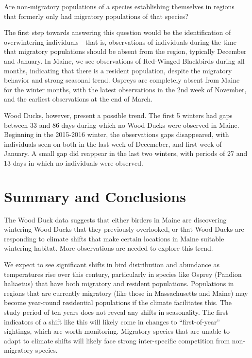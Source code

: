 \documentclass[
  12pt,
]{article}
\begin{document}
Are non-migratory populations of a species establishing themselves in
regions that formerly only had migratory populations of that species?

The first step towards answering this question would be the
identification of overwintering individuals - that is, observations of
individuals during the time that migratory populations should be absent
from the region, typically December and January. In Maine, we see
observations of Red-Winged Blackbirds during all months, indicating that
there is a resident population, despite the migratory behavior and
strong seasonal trend. Ospreys are completely absent from Maine for the
winter months, with the latest observations in the 2nd week of November,
and the earliest observations at the end of March.

Wood Ducks, however, present a possible trend. The first 5 winters had
gaps between 33 and 86 days during which no Wood Ducks were observed in
Maine. Beginning in the 2015-2016 winter, the observations gaps
disappeared, with individuals seen on both in the last week of
Decemeber, and first week of January. A small gap did reappear in the
last two winters, with periods of 27 and 13 days in which no individuals
were observed.

\newpage

\hypertarget{summary-and-conclusions}{%
\section{Summary and Conclusions}\label{summary-and-conclusions}}

The Wood Duck data suggests that either birders in Maine are discovering
wintering Wood Ducks that they previously overlooked, or that Wood Ducks
are responding to climate shifts that make certain locations in Maine
suitable wintering habitat. More observations are needed to explore this
trend.

We expect to see significant shifts in bird distribution and abundance
as temperatures rise over this century, particularly in species like
Osprey (Pandion haliaetus) that have both migratory and resident
populations. Populations in regions that are currently migratory (like
those in Massachusetts and Maine) may become year-round residential
populations if the climate facilitates this. The study period of ten
years does not reveal any shifts in seasonality. The first indicators of
a shift like this will likely come in changes to ``first-of-year''
sightings, which are worth monitoring. Migratory species that are unable
to adapt to climate shifts will likely face strong inter-specific
competition from non-migratory species.
\end{document}
